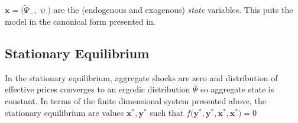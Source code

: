 \documentclass[a4paper,10pt]{article}  %
\begin{document}
$ \mathbf{x} = \big(\widetilde{\Psi}_{-}, \uppsi \big) $ are the (endogenous and exogenous) \emph{state} variables.
This puts the model in the canonical form presented in. %



\subsection{Stationary Equilibrium} %
\label{sub:stationary_equilibrium}

In the stationary equilibrium, aggregate shocks are zero and distribution of effective prices converges to an ergodic distribution $
\widetilde{\Psi} $ so aggregate state is constant. In terms of the finite dimensional system presented above, the stationary equilibrium are values
$ \mathbf{x}^*,\mathbf{y}^* $ such that $ f \big( \mathbf{y}^*,\mathbf{y}^*, \mathbf{x}^*, \mathbf{x}^* \big) = 0 $
\end{document}
